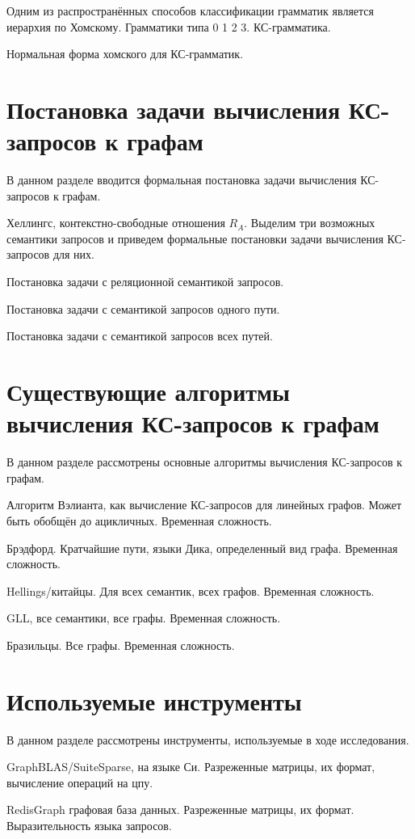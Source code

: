 Одним из распространённых способов классификации грамматик является иерархия по Хомскому. Грамматики типа 0 1 2 3. КС-грамматика.

Нормальная форма хомского для КС-грамматик.

\section{Постановка задачи вычисления КС-запросов к графам}\label{sec:ch1/sec3}
В данном разделе вводится формальная постановка задачи вычисления КС-запросов к графам.

Хеллингс, контекстно-свободные отношения $R_A$. Выделим три возможных семантики запросов и приведем формальные постановки задачи вычисления КС-запросов для них.

Постановка задачи с реляционной семантикой запросов.

Постановка задачи с семантикой запросов одного пути.

Постановка задачи с семантикой запросов всех путей.

\section{Существующие алгоритмы вычисления КС-запросов к графам}\label{sec:ch1/sec4}
В данном разделе рассмотрены основные алгоритмы вычисления КС-запросов к графам.

Алгоритм Вэлианта, как вычисление КС-запросов для линейных графов. Может быть обобщён до ацикличных. Временная сложность.

Брэдфорд. Кратчайшие пути, языки Дика, определенный вид графа. Временная сложность.

Hellings/китайцы. Для всех семантик, всех графов. Временная сложность.

GLL, все семантики, все графы. Временная сложность.

Бразильцы. Все графы. Временная сложность.

\section{Используемые инструменты}\label{sec:ch1/sec5}
В данном разделе рассмотрены инструменты, используемые в ходе исследования.

GraphBLAS/SuiteSparse, на языке Си. Разреженные матрицы, их формат, вычисление операций на цпу.

RedisGraph графовая база данных. Разреженные матрицы, их формат. Выразительность языка запросов.


